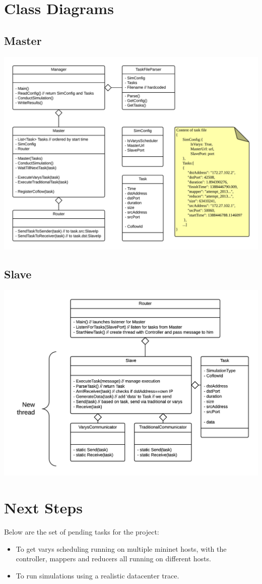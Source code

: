 \documentclass{article}
\begin{document}
\section{Class Diagrams}
\subsection{Master}
\includegraphics[scale = 0.75]{master.png}
\subsection{Slave}
\includegraphics[scale = 0.75]{slave.png}

\section{Next Steps}
Below are the set of pending tasks for the project:
\begin{itemize}
	\item To get varys scheduling running on multiple mininet hosts, with the controller, mappers and reducers all running on different hosts.
	\item To run simulations using a realistic datacenter trace.
\end{itemize}
\end{document}
